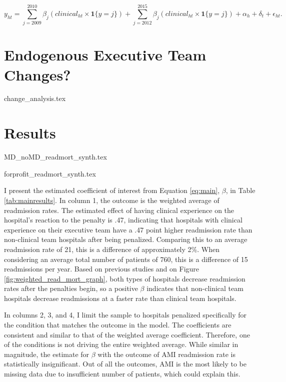 \documentclass[12pt]{article}
\begin{document}
    \begin{equation}
    \label{eq:es}
    y_{ht} = \sum_{j=2009}^{2010}\beta_j(clinical_{ht} \times \mathbf{1}\{y=j\}) + \sum_{j=2012}^{2015}\beta_j (clinical_{ht} \times \mathbf{1}\{y=j\}) + \alpha_{h} + \delta_t + \epsilon_{ht}.
    \end{equation}

    \section{Endogenous Executive Team Changes?}

    {change_analysis.tex}

    \section{Results}

    {MD_noMD_readmort_synth.tex}


    {forprofit_readmort_synth.tex}




    I present the estimated coefficient of interest from Equation \ref{eq:main}, $\beta$, in Table \ref{tab:mainresults}. In column 1, the outcome is the weighted average of readmission rates. The estimated effect of having clinical experience on the hospital's reaction to the penalty is .47, indicating that hospitals with clinical experience on their executive team have a .47 point higher readmission rate than non-clinical team hospitals after being penalized. Comparing this to an average readmission rate of 21, this is a difference of approximately 2\%. When considering an average total number of patients of 760, this is a difference of 15 readmissions per year. Based on previous studies and on Figure \ref{fig:weighted_read_mort_graph}, both types of hospitals decrease readmission rates after the penalties begin, so a positive $\beta$ indicates that non-clinical team hospitals decrease readmissions at a faster rate than clinical team hospitals. 
    
    In columns 2, 3, and 4, I limit the sample to hospitals penalized specifically for the condition that matches the outcome in the model. The coefficients are consistent and similar to that of the weighted average coefficient. Therefore, one of the conditions is not driving the entire weighted average. While similar in magnitude, the estimate for $\beta$ with the outcome of AMI readmission rate is statistically insignificant. Out of all the outcomes, AMI is the most likely to be missing data due to insufficient number of patients, which could explain this. 
\end{document}
